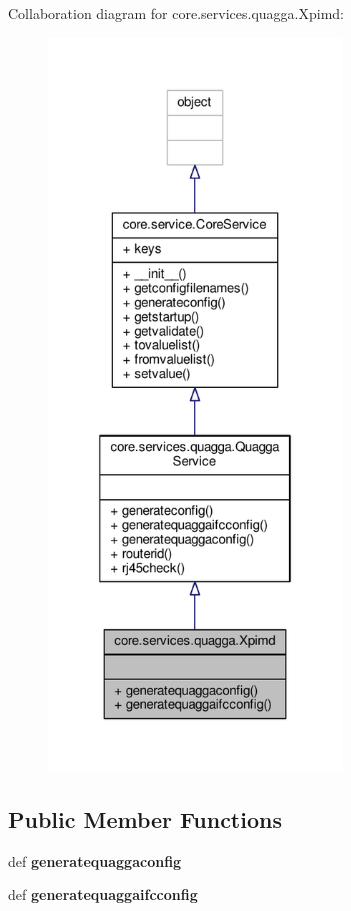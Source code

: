 Collaboration diagram for core.\+services.\+quagga.\+Xpimd\+:
\nopagebreak
\begin{figure}[H]
\begin{center}
\leavevmode
\includegraphics[height=550pt]{classcore_1_1services_1_1quagga_1_1_xpimd__coll__graph}
\end{center}
\end{figure}
\subsection*{Public Member Functions}
\begin{DoxyCompactItemize}
\item 
\hypertarget{classcore_1_1services_1_1quagga_1_1_xpimd_a3b9c301990bb1a876b24e58c8eb797b4}{def {\bfseries generatequaggaconfig}}\label{classcore_1_1services_1_1quagga_1_1_xpimd_a3b9c301990bb1a876b24e58c8eb797b4}

\item 
\hypertarget{classcore_1_1services_1_1quagga_1_1_xpimd_a227f8338b92f5fad15f28e4bc7af0cf5}{def {\bfseries generatequaggaifcconfig}}\label{classcore_1_1services_1_1quagga_1_1_xpimd_a227f8338b92f5fad15f28e4bc7af0cf5}

\end{DoxyCompactItemize}
